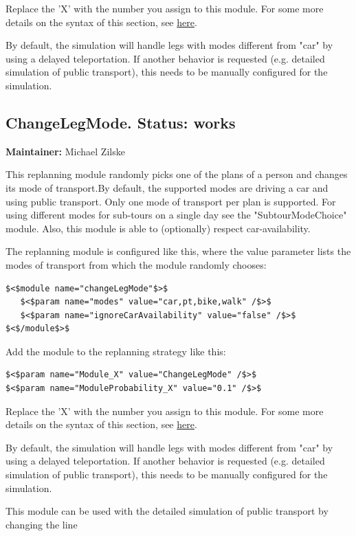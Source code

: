 Replace the 'X' with the number you assign to this module. For some more details on the syntax of this section, see \href{http://matsim.org/node/478}{here}.


By default, the simulation will handle legs with modes different from  "car" by using a delayed teleportation. If another behavior is  requested (e.g. detailed simulation of public transport), this needs to  be manually configured for the simulation.


\subsection{ChangeLegMode. Status: works}


\textbf{Maintainer:} Michael Zilske

This replanning module randomly picks one of the plans of a person  and changes its mode of transport.By default, the supported modes  are driving a car and using public transport. Only one mode of transport  per plan is supported. For using different modes for sub-tours on a  single day see the "SubtourModeChoice" module. Also, this module is able  to (optionally) respect car-availability.

The replanning module is configured like this, where the value  parameter lists the modes of transport from which the module randomly  chooses:
\begin{verbatim}
$<$module name="changeLegMode"$>$
   $<$param name="modes" value="car,pt,bike,walk" /$>$
   $<$param name="ignoreCarAvailability" value="false" /$>$
$<$/module$>$
\end{verbatim}

Add the module to the replanning strategy like this:
\begin{verbatim}
$<$param name="Module_X" value="ChangeLegMode" /$>$
$<$param name="ModuleProbability_X" value="0.1" /$>$
\end{verbatim}

Replace the 'X' with the number you assign to this module. For some more details on the syntax of this section, see \href{http://matsim.org/node/478}{here}.

By default, the simulation will handle legs with modes different from  "car" by using a delayed teleportation. If another behavior is  requested (e.g. detailed simulation of public transport), this needs to  be manually configured for the simulation.

This module can be used with the detailed simulation of public transport by changing the line

